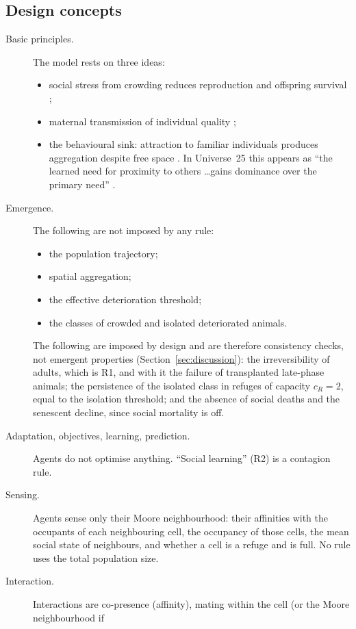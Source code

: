 \subsection{Design concepts}
\begin{description}
\item[Basic principles.] The model rests on three ideas:
  \begin{itemize}
  \item social stress from crowding reduces reproduction and offspring survival
    \cite{Christian1950,Southwick1955};
  \item maternal transmission of individual quality \cite{GinzburgTaneyhill1994,InchaustiGinzburg1998};
  \item the behavioural sink: attraction to familiar individuals produces aggregation despite free space
    \cite{Calhoun1962}. In Universe~25 this appears as ``the learned need for proximity to others \ldots gains
    dominance over the primary need'' \cite{Calhoun1973}.
  \end{itemize}
\item[Emergence.] The following are not imposed by any rule:
  \begin{itemize}
  \item the population trajectory;
  \item spatial aggregation;
  \item the effective deterioration threshold;
  \item the classes of crowded and isolated deteriorated animals.
  \end{itemize}
  The following are imposed by design and are therefore consistency checks, not emergent properties
  (Section~\ref{sec:discussion}): the irreversibility of adults, which is R1, and with it the failure of transplanted
  late-phase animals; the persistence of the isolated class in refuges of capacity $c_R=2$, equal to the isolation
  threshold; and the absence of social deaths and the senescent decline, since social mortality is off.
\item[Adaptation, objectives, learning, prediction.] Agents do not optimise anything. ``Social learning'' (R2) is a
  contagion rule.
\item[Sensing.] Agents sense only their Moore neighbourhood: their affinities with the occupants of each neighbouring
  cell, the occupancy of those cells, the mean social state of neighbours, and whether a cell is a refuge and is
  full. No rule uses the total population size.
\item[Interaction.] Interactions are co-presence (affinity), mating within the cell (or the Moore neighbourhood if

\end{description}
